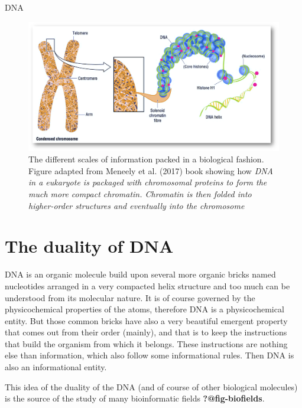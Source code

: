 \documentclass[
  letterpaper,
  DIV=11,
  numbers=noendperiod,
  oneside]{scrreprt}
\begin{document}
DNA

\begin{figure}

{\centering \includegraphics{chs-sequence-analysis/imgs-seqan/chromosome-genes.png}

}

\caption{\label{fig-chromosome}The different scales of information
packed in a biological fashion. Figure adapted from Meneely et al.
(2017) book showing how \emph{DNA in a eukaryote is packaged with
chromosomal proteins to form the much more compact chromatin. Chromatin
is then folded into higher-order structures and eventually into the
chromosome}}

\end{figure}

\hypertarget{the-duality-of-dna}{%
\section{The duality of DNA}\label{the-duality-of-dna}}

DNA is an organic molecule build upon several more organic bricks named
nucleotides arranged in a very compacted helix structure and too much
can be understood from its molecular nature. It is of course governed by
the physicochemical properties of the atoms, therefore DNA is a
physicochemical entity. But those common bricks have also a very
beautiful emergent property that comes out from their order (mainly),
and that is to keep the instructions that build the organism from which
it belongs. These instructions are nothing else than information, which
also follow some informational rules. Then DNA is also an informational
entity.

This idea of the duality of the DNA (and of course of other biological
molecules) is the source of the study of many bioinformatic fields
\textbf{?@fig-biofields}.
\end{document}
